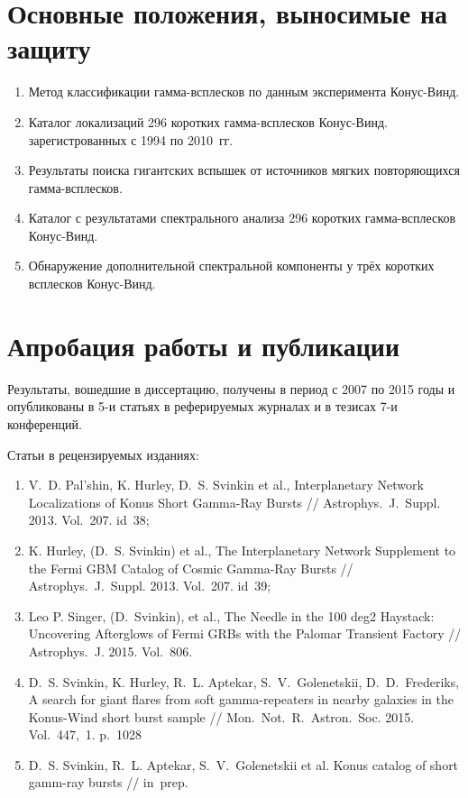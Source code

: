 \section*{Основные положения, выносимые на защиту}

\begin{enumerate}
\item Метод классификации гамма-всплесков по данным эксперимента Конус-Винд.
\item Каталог локализаций 296 коротких гамма-всплесков Конус-Винд. 
  зарегистрованных с 1994 по 2010~гг.
\item Результаты поиска гигантских вспышек от источников мягких повторяющихся гамма-всплесков.
\item Каталог с результатами спектрального анализа 296 коротких гамма-всплесков Конус-Винд.
\item Обнаружение дополнительной спектральной компоненты у трёх коротких всплесков Конус-Винд.
\end{enumerate}

\section*{Апробация работы и публикации}
Результаты, вошедшие в диссертацию, получены в период с 2007 по 2015
годы и опубликованы в 5-и статьях в реферируемых журналах и в тезисах 7-и конференций. 

Статьи в рецензируемых изданиях:
\begin{enumerate}
\item V.~D. Pal'shin, K. Hurley, D.~S. Svinkin et al., Interplanetary Network Localizations of
Konus Short Gamma-Ray Bursts // Astrophys.~J.~Suppl. 2013. Vol.~207. id~38;
\item K. Hurley, (D.~S. Svinkin) et al., The Interplanetary Network Supplement to 
the Fermi GBM Catalog of Cosmic Gamma-Ray Bursts // Astrophys.~J.~Suppl. 2013. Vol.~207. id~39;
\item Leo P. Singer, (D.~Svinkin), et al., The Needle in the 100 deg2 Haystack: 
Uncovering Afterglows of Fermi GRBs with the Palomar Transient Factory // 
Astrophys.~J. 2015. Vol.~806.
\item D.~S. Svinkin, K. Hurley, R.~L. Aptekar, S.~V.~Golenetskii, D.~D.~Frederiks, 
A search for giant flares from soft gamma-repeaters in nearby galaxies in the 
Konus-Wind short burst sample // Mon.~Not.~R.~Astron.~Soc. 2015. Vol.~447,~1. p.~1028
\item D.~S. Svinkin, R.~L. Aptekar, S.~V.~Golenetskii et al. 
Konus catalog of short gamm-ray bursts // in~prep.
\end{enumerate}

